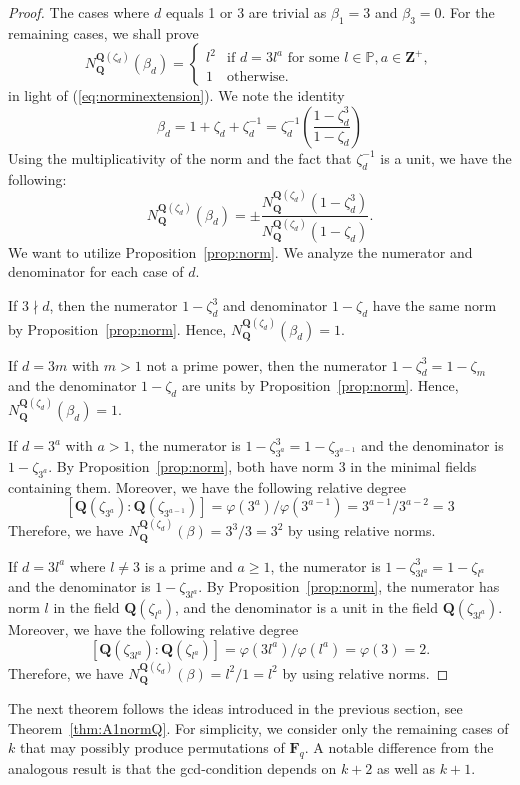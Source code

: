 \documentclass{amsart}
\newcommand{\Q}{\mathbf Q}
\newcommand{\Z}{\mathbf Z}
\newcommand{\F}{\mathbf F}
\newcommand{\cycl}[1]{\Q(\zeta_{#1})}
\numberwithin{equation}{section}
\theoremstyle{plain}
\theoremstyle{definition}
\begin{document}
\begin{proof}
The cases where $d$ equals 1 or 3 are trivial as $\beta_1=3$ and $\beta_3=0$. For the remaining cases, we shall prove
\[N_{\Q}^{\Q(\zeta_d)}(\beta_d) = 
\begin{cases} 
	l^2 & \text{if } d = 3l^a \text{ for some }l\in\mathbb{P}, a\in\Z^{+},\\
	1 & \text{otherwise}.
\end{cases}\]
in light of (\ref{eq:norminextension}). We note the identity 
$$\beta_d=1 + \zeta_d + \zeta_d^{-1}=\zeta_d^{-1}\left(\dfrac{1-\zeta_d^3}{1-\zeta_d}\right)$$ 
Using the multiplicativity of the norm and the fact that $\zeta_d^{-1}$ is a unit, we have the following:
$$N_{\Q}^{\cycl{d}}(\beta_d) = \pm \frac{N_{\Q}^{\cycl{d}} \left(1-\zeta_d^3\right)}{N_{\Q}^{\cycl{d}}\left(1-\zeta_d\right)}.$$
We want to utilize Proposition~\ref{prop:norm}. We analyze the numerator and denominator for each case of $d$.

If $3\nmid d$, then the numerator $1-\zeta_d^3$ and denominator $1-\zeta_d$ have the same norm by Proposition~\ref{prop:norm}. Hence, $N_{\Q}^{\cycl{d}}(\beta_d)=1$.
	
If $d=3m$ with $m>1$ not a prime power, then the numerator $1-\zeta_d^3=1-\zeta_m$ and the denominator $1-\zeta_d$ are units by Proposition~\ref{prop:norm}. Hence, $N_{\Q}^{\cycl{d}}(\beta_d)=1$.
	
If $d=3^a$ with $a>1$, the numerator is $1-\zeta_{3^a}^3 = 1-\zeta_{3^{a-1}}$ and the denominator is $1-\zeta_{3^a}$. By Proposition~\ref{prop:norm}, both have norm $3$ in the minimal fields containing them. Moreover, we have the following relative degree
$$[\cycl{3^a}:\cycl{3^{a-1}}] = \varphi(3^a)/\varphi(3^{a-1}) = 3^{a-1}/3^{a-2} = 3$$
Therefore, we have $N_{\Q}^{\cycl{d}}(\beta) = 3^3/3 = 3^2$ by using relative norms.
	
If $d=3l^a$ where $l\neq3$ is a prime and $a\geq1$, the numerator is $1-\zeta_{3l^a}^3 = 1-\zeta_{l^a}$ and the denominator is $1-\zeta_{3l^a}$. By Proposition~\ref{prop:norm}, the numerator has norm $l$ in the field $\cycl{l^a}$, and the denominator is a unit in the field $\cycl{3l^a}$. Moreover, we have the following relative degree
$$[\cycl{3l^a}:\cycl{l^a}] = \varphi(3l^a)/\varphi(l^a) = \varphi(3) = 2.$$
Therefore, we have $N_{\Q}^{\cycl{d}}(\beta) = l^2/1 = l^2$ by using relative norms.
\end{proof}

The next theorem follows the ideas introduced in the previous section, see Theorem~\ref{thm:A1normQ}. For simplicity, we consider only the remaining cases of $k$ that may possibly produce permutations of $\F_q$. A notable difference from the analogous result is that the gcd-condition depends on $k+2$ as well as $k+1$.
\end{document}
